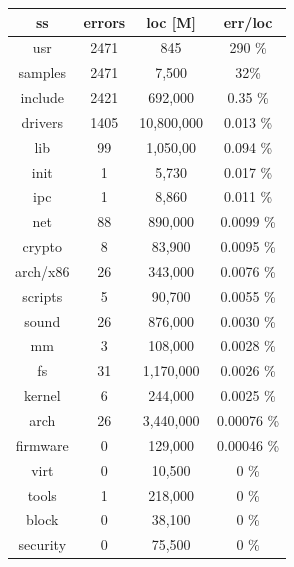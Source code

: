 \documentclass[a4paper,11pt]{report}
\newcommand{\figa}{
    \begin{figure}[!htpb]
    \centering
}
\newcommand{\figb}[2]{
    \caption{#1}
    \label{#2}
    \end{figure}
}
\begin{document}
\iffalse %

\figa
    \begin{tabular}{c|c|c|c}
        \hline
        \hline
        ss     & errors  & loc [M]     & err/loc \\
        \hline 
        usr     & 2471    & 845          & 290 \% \\
        samples & 2471    & 7,500        & 32\% \\
        include & 2421    & 692,000      & 0.35 \% \\
        drivers & 1405    & 10,800,000   & 0.013 \% \\
        lib     & 99      & 1,050,00     & 0.094 \% \\
        init    & 1       & 5,730        & 0.017 \% \\
        ipc     & 1       & 8,860        & 0.011 \% \\
        net     & 88      & 890,000      & 0.0099 \% \\
        crypto  & 8       & 83,900       & 0.0095 \% \\
        arch/x86 & 26     & 343,000      & 0.0076 \% \\
        scripts & 5       & 90,700       & 0.0055 \% \\
        sound   & 26      & 876,000      & 0.0030 \% \\
        mm      & 3       & 108,000      & 0.0028 \% \\
        fs      & 31      & 1,170,000    & 0.0026 \% \\
        kernel  & 6       & 244,000      & 0.0025 \% \\
        arch    & 26      & 3,440,000    & 0.00076 \% \\
        firmware & 0       & 129,000      & 0.00046 \% \\
        virt    & 0       & 10,500       & 0    \% \\
        tools   & 1       & 218,000      & 0    \% \\
        block   & 0       & 38,100       & 0    \% \\
        security & 0       & 75,500       & 0   \% \\
        \hline
        \hline
    \end{tabular}
\figb{}{}
\end{document}
